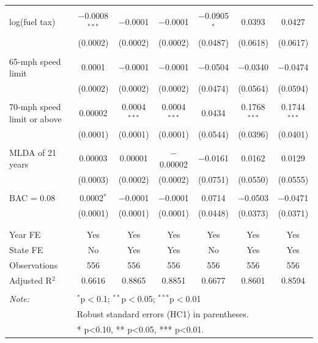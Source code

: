 \begin{table}[!htbp]
\begin{tabular}{@{\extracolsep{5pt}}lcccccc}
  & & & & & & \\ 
 log(fuel tax) & $-$0.0008$^{***}$ & $-$0.0001 & $-$0.0001 & $-$0.0905$^{*}$ & 0.0393 & 0.0427 \\ 
  & (0.0002) & (0.0002) & (0.0002) & (0.0487) & (0.0618) & (0.0617) \\ 
  & & & & & & \\ 
 65-mph speed limit & 0.0001 & $-$0.0001 & $-$0.0001 & $-$0.0504 & $-$0.0340 & $-$0.0474 \\ 
  & (0.0002) & (0.0002) & (0.0002) & (0.0474) & (0.0564) & (0.0594) \\ 
  & & & & & & \\ 
 70-mph speed limit or above & 0.00002 & 0.0004$^{***}$ & 0.0004$^{***}$ & 0.0434 & 0.1768$^{***}$ & 0.1744$^{***}$ \\ 
  & (0.0001) & (0.0001) & (0.0001) & (0.0544) & (0.0396) & (0.0401) \\ 
  & & & & & & \\ 
 MLDA of 21 years & 0.00003 & 0.00001 & $-$0.00002 & $-$0.0161 & 0.0162 & 0.0129 \\ 
  & (0.0003) & (0.0002) & (0.0002) & (0.0751) & (0.0550) & (0.0555) \\ 
  & & & & & & \\ 
 BAC = 0.08 & 0.0002$^{*}$ & $-$0.0001 & $-$0.0001 & 0.0714 & $-$0.0503 & $-$0.0471 \\ 
  & (0.0001) & (0.0001) & (0.0001) & (0.0448) & (0.0373) & (0.0371) \\ 
  & & & & & & \\ 
\hline \\[-1.8ex] 
Year FE & Yes & Yes & Yes & Yes & Yes & Yes \\ 
State FE & No & Yes & Yes & No & Yes & Yes \\ 
Observations & 556 & 556 & 556 & 556 & 556 & 556 \\ 
Adjusted R$^{2}$ & 0.6616 & 0.8865 & 0.8851 & 0.6677 & 0.8601 & 0.8594 \\ 
\hline 
\hline \\[-1.8ex] 
\textit{Note:}  & \multicolumn{6}{l}{$^{*}$p$<$0.1; $^{**}$p$<$0.05; $^{***}$p$<$0.01} \\ 
 & \multicolumn{6}{l}{Robust standard errors (HC1) in parentheses.} \\ 
 & \multicolumn{6}{l}{* p<0.10, ** p<0.05, *** p<0.01.} \\ 
\end{tabular} 
\end{table} 
